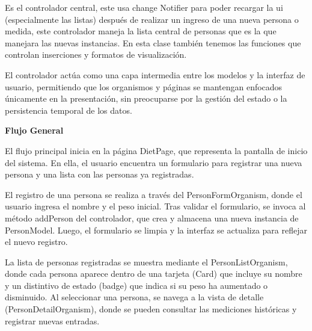 Es el controlador central, este usa change Notifier para poder recargar la ui (especialmente las listas) después de realizar un ingreso de una nueva persona o medida, este controlador maneja la lista central de personas que es la que manejara las nuevas instancias. En esta clase también tenemos las funciones que controlan inserciones y formatos de visualización.

El controlador actúa como una capa intermedia entre los modelos y la interfaz de usuario, permitiendo que los organismos y páginas se mantengan enfocados únicamente en la presentación, sin preocuparse por la gestión del estado o la persistencia temporal de los datos.

\textbf{Flujo General}

El flujo principal inicia en la página DietPage, que representa la pantalla de inicio del sistema. En ella, el usuario encuentra un formulario para registrar una nueva persona y una lista con las personas ya registradas.

El registro de una persona se realiza a través del PersonFormOrganism, donde el usuario ingresa el nombre y el peso inicial. Tras validar el formulario, se invoca al método addPerson del controlador, que crea y almacena una nueva instancia de PersonModel. Luego, el formulario se limpia y la interfaz se actualiza para reflejar el nuevo registro.

La lista de personas registradas se muestra mediante el PersonListOrganism, donde cada persona aparece dentro de una tarjeta (Card) que incluye su nombre y un distintivo de estado (badge) que indica si su peso ha aumentado o disminuido. Al seleccionar una persona, se navega a la vista de detalle (PersonDetailOrganism), donde se pueden consultar las mediciones históricas y registrar nuevas entradas.
